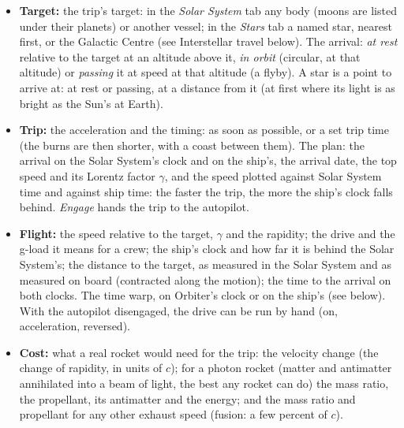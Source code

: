 \documentclass[Orbiter User Manual.tex]{subfiles}
\begin{document}
\begin{itemize}
\item \textbf{Target:} the trip's target: in the \textit{Solar System} tab any body (moons are listed under their planets) or another vessel; in the \textit{Stars} tab a named star, nearest first, or the Galactic Centre (see Interstellar travel below). The arrival: \textit{at rest} relative to the target at an altitude above it, \textit{in orbit} (circular, at that altitude) or \textit{passing} it at speed at that altitude (a flyby). A star is a point to arrive at: at rest or passing, at a distance from it (at first where its light is as bright as the Sun's at Earth).
\item \textbf{Trip:} the acceleration and the timing: as soon as possible, or a set trip time (the burns are then shorter, with a coast between them). The plan: the arrival on the Solar System's clock and on the ship's, the arrival date, the top speed and its Lorentz factor $\gamma$, and the speed plotted against Solar System time and against ship time: the faster the trip, the more the ship's clock falls behind. \textit{Engage} hands the trip to the autopilot.
\item \textbf{Flight:} the speed relative to the target, $\gamma$ and the rapidity; the drive and the g-load it means for a crew; the ship's clock and how far it is behind the Solar System's; the distance to the target, as measured in the Solar System and as measured on board (contracted along the motion); the time to the arrival on both clocks. The time warp, on Orbiter's clock or on the ship's (see below). With the autopilot disengaged, the drive can be run by hand (on, acceleration, reversed).
\item \textbf{Cost:} what a real rocket would need for the trip: the velocity change (the change of rapidity, in units of $c$); for a photon rocket (matter and antimatter annihilated into a beam of light, the best any rocket can do) the mass ratio, the propellant, its antimatter and the energy; and the mass ratio and propellant for any other exhaust speed (fusion: a few percent of $c$).
\end{itemize}
\end{document}
